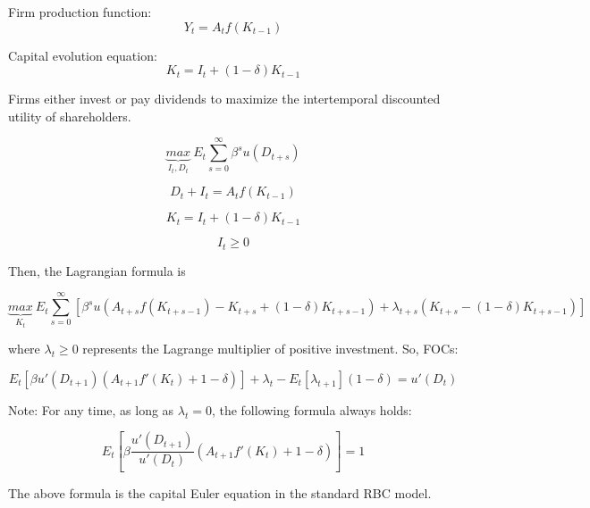 \documentclass[10pt,math=newtx,citestyle=gb7714-2015,bibstyle=gb7714-2015]{elegantbook}
\begin{document}
Firm production function:
\begin{equation}\label{label}
	Y_t=A_tf(K_{t-1})
\end{equation}

Capital evolution equation:
\begin{equation}\label{label}
	K_t=I_t+(1-\delta)K_{t-1}
\end{equation}

Firms either invest or pay dividends to maximize the intertemporal discounted utility of shareholders.

\begin{equation}\label{label}
	\underbrace{max}_{I_t,D_t}~E_t\sum_{s=0}^{\infty}\beta^{s}u(D_{t+s})
\end{equation}

\begin{equation}\label{label}
	D_t+I_t=A_tf(K_{t-1})
\end{equation}

\begin{equation}\label{label}
	K_t=I_t+(1-\delta)K_{t-1}
\end{equation}

\begin{equation}\label{label}
	I_t\ge0
\end{equation}

Then, the Lagrangian formula is

\begin{equation}\label{label}
	\underbrace{max}_{K_t}~E_t\sum_{s=0}^{\infty}[\beta^{s}u(A_{t+s}f(K_{t+s-1})-K_{t+s}+(1-\delta)K_{t+s-1})+\lambda_{t+s}(K_{t+s}-(1-\delta)K_{t+s-1})]
\end{equation}

where  $\lambda_t\ge0$ represents the Lagrange multiplier of positive investment. So, FOCs:

\begin{equation}\label{label}
	E_t\left[\beta u'(D_{t+1})(A_{t+1}f'(K_t)+1-\delta)\right]+\lambda_t-E_t[\lambda_{t+1}](1-\delta)=u'(D_t)
\end{equation}

Note: For any time, as long as $\lambda_t=0$, the following formula always holds:

\begin{equation}\label{label}
	E_t\left[\beta \frac{u'(D_{t+1})}{u'(D_t)}(A_{t+1}f'(K_t)+1-\delta)\right]=1
\end{equation}

The above formula is the capital Euler equation in the standard RBC model.
\end{document}
